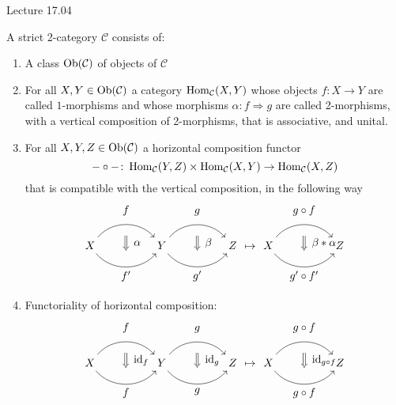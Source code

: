 Lecture 17.04

\begin{defi}
	A strict 2-category $ \mathcal{ C } $ 
	consists of:
	\begin{enumerate}
		\item 
		A class $ \operatorname{Ob} ( \mathcal{C} ) $ of objects of $ \mathcal{C} $
		
		\item 
		For all $ X , Y \in \operatorname{Ob}( \mathcal{ C } ) $ a category $ \operatorname{Hom}_{ \mathcal{ C } } ( X , Y )$ whose objects 
		$f \colon X \to Y $ are called $1$-morphisms and whose morphisms $ \alpha \colon f \Rightarrow g $ are called 2-morphisms, with a vertical composition of 2-morphisms, that 
		is associative, and unital.
		
		\item 
		For all $ X , Y , Z \in \operatorname{Ob}( \mathcal{C} ) $ a horizontal composition functor
		\[
		-\circ- \colon \operatorname{Hom}_{ \mathcal{ C } } ( Y , Z ) \times \operatorname{Hom}_{ \mathcal{ C } } ( X , Y ) \to \operatorname{Hom}_{ \mathcal{ C } } ( X , Z )
		\]
		that is compatible with the vertical composition, in the following way 
		\[
		\begin{tikzcd}
			X
			\arrow[bend left=50]{rr}[name=U',label=above:$f$]{}
			\arrow[bend right=50]{rr}[name=D',label=below:$f'$]{}
			&&
			Y
			\arrow[shorten <=10pt,shorten >=10pt,Rightarrow,to path={(U')-- node[label=right:$ \alpha $] {} (D')}]{} 
			\arrow[bend left=50]{rr}[name=U'',label=above:$g$]{}
			\arrow[bend right=50]{rr}[name=D'',label=below:$g'$]{}
			&&
			Z
			\arrow[shorten <=10pt,shorten >=10pt,Rightarrow,to path={(U'')-- node[label=right:$\beta$] {} (D'')}]{} 
		\end{tikzcd}
		\mapsto
		\begin{tikzcd}
			X
			\arrow[bend left=50]{rr}[name=U',label=above:$g \circ f$]{}
			\arrow[bend right=50]{rr}[name=D',label=below:$g' \circ f'$]{}
			&&
			Z
			\arrow[shorten <=10pt,shorten >=10pt,Rightarrow,to path={(U')-- node[label=right:$ \beta * \alpha $] {} (D')}]{} 
		\end{tikzcd} 	
		\]
		
		\item 
		Functoriality of horizontal composition:
		\[
		\begin{tikzcd}
			X
			\arrow[bend left=50]{rr}[name=U',label=above:$f$]{}
			\arrow[bend right=50]{rr}[name=D',label=below:$f$]{}
			&&
			Y
			\arrow[shorten <=10pt,shorten >=10pt,Rightarrow,to path={(U')-- node[label=right:$ \id_f $] {} (D')}]{} 
			\arrow[bend left=50]{rr}[name=U'',label=above:$g$]{}
			\arrow[bend right=50]{rr}[name=D'',label=below:$g$]{}
			&&
			Z
			\arrow[shorten <=10pt,shorten >=10pt,Rightarrow,to path={(U'')-- node[label=right:$ \id_g $] {} (D'')}]{} 
		\end{tikzcd}
		\mapsto
			\begin{tikzcd}
			X
			\arrow[bend left=50]{rr}[name=U',label=above:$g \circ f$]{}
			\arrow[bend right=50]{rr}[name=D',label=below:$g \circ f$]{}
			&&
			Z
			\arrow[shorten <=10pt,shorten >=10pt,Rightarrow,to path={(U')-- node[label=right:$ \id_{ g \circ f } $] {} (D')}]{} 
		\end{tikzcd} 
		\]
		

\end{enumerate}
\end{defi}
